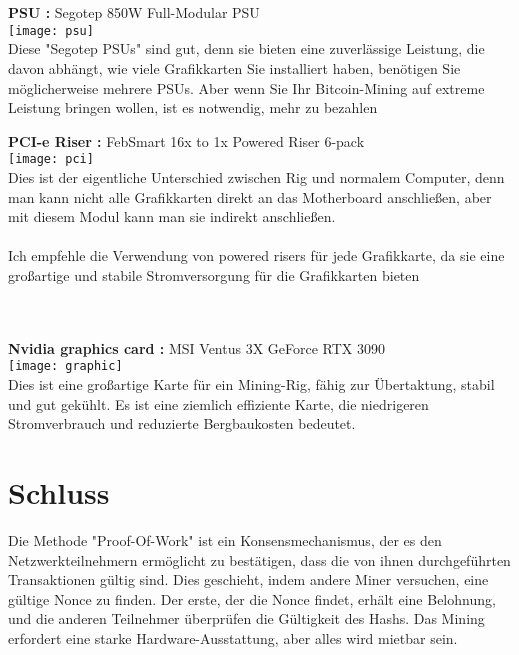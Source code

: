 \documentclass[ngerman]{scrreprt}
\begin{document}
\\ \\
\begin{large}
	\textbf{PSU :} Segotep 850W Full-Modular PSU \\ 
	\texttt{[image: psu]}  \\
	Diese "Segotep PSUs" sind gut, denn sie bieten eine zuverlässige Leistung, die davon abhängt, wie viele Grafikkarten Sie installiert haben, benötigen Sie möglicherweise mehrere PSUs. Aber wenn Sie Ihr Bitcoin-Mining auf extreme Leistung bringen wollen, ist es notwendig, mehr zu bezahlen \\
\end{large}
\newpage
\begin{large}
	\textbf{PCI-e Riser :} FebSmart 16x to 1x Powered Riser 6-pack \\ 
	\texttt{[image: pci]}  \\
	Dies ist der eigentliche Unterschied zwischen Rig und normalem Computer, denn man kann nicht alle Grafikkarten direkt an das Motherboard anschließen, aber mit diesem Modul kann man sie indirekt anschließen.\\ \\
	
	Ich empfehle die Verwendung von powered risers für jede Grafikkarte, da sie eine großartige und stabile Stromversorgung für die Grafikkarten bieten \\ \\ \\
	
	
\end{large}

\begin{large}
	\textbf{Nvidia graphics card :} MSI Ventus 3X GeForce RTX 3090
	 \\ 
	\texttt{[image: graphic]}  \\
	Dies ist eine großartige Karte für ein Mining-Rig, fähig zur Übertaktung, stabil und gut gekühlt. Es ist eine ziemlich effiziente Karte, die niedrigeren Stromverbrauch und reduzierte Bergbaukosten bedeutet. \\ 
	
	
\end{large}

\chapter{Schluss}
Die Methode "Proof-Of-Work" ist ein Konsensmechanismus, der es den Netzwerkteilnehmern ermöglicht zu bestätigen, dass die von ihnen durchgeführten Transaktionen gültig sind. Dies geschieht, indem andere Miner versuchen, eine gültige Nonce zu finden. Der erste, der die Nonce findet, erhält eine Belohnung, und die anderen Teilnehmer überprüfen die Gültigkeit des Hashs. Das Mining erfordert eine starke Hardware-Ausstattung, aber alles wird mietbar sein.\\ \\ \\
\end{document}
